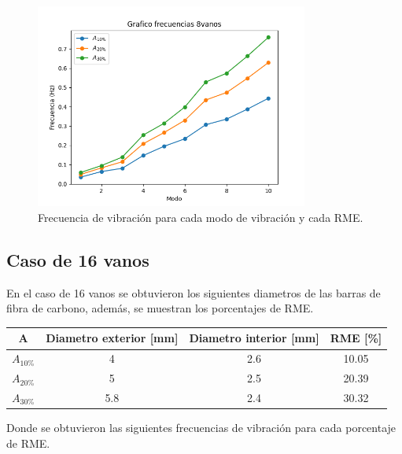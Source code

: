 \begin{figure}[H]
    \centering
    \includegraphics[width=0.8\textwidth]{../grafico_frecuencias_8vanos.png}
    \caption{Frecuencia de vibración para cada modo de vibración y cada RME.}
\end{figure}

\newpage

\subsection{Caso de 16 vanos}
En el caso de 16 vanos se obtuvieron los siguientes diametros de las barras de fibra de carbono, además, se muestran los porcentajes de RME.

\begin{table}[H]
    \centering
    \begin{tabular}{cccc}
    \toprule
     A & Diametro exterior [mm] & Diametro interior [mm] & RME [\%] \\
    \midrule
     $A_{10\%}$ &  4 &  2.6 &  10.05 \\
     $A_{20\%}$ &  5 &  2.5 &  20.39 \\
     $A_{30\%}$ &  5.8 &  2.4 &  30.32 \\
    \bottomrule
    \end{tabular}
\end{table}

Donde se obtuvieron las siguientes frecuencias de vibración para cada porcentaje de RME.

